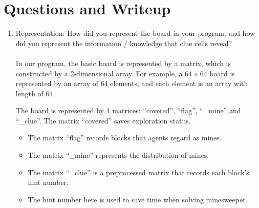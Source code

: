 \documentclass[letter]{article}
\begin{document}
\section{Questions and Writeup}
\label{sec:Questions and Writeup}
\begin{enumerate}
	\item {Representation: How did you represent the board in your program, and how did you represent the information / knowledge that clue cells reveal?} \\
	\\
	In our program, the basic board is represented by a matrix, which is constructed by a 2-dimensional array. For example, a $ 64 \times 64 $ board is represented by an array of 64 elements, and each element is an array with length of 64. 
	
	The board is represented by 4 matrices:  “covered”, “flag”,  “\_mine” and “\_clue”. The matrix “covered” saves exploration status. 
	\begin{itemize}
		\item {The matrix “flag” records blocks that agents regard as mines.} 
		\item {The matrix “\_mine” represents the distribution of mines.} 
		\item {The matrix “\_clue” is a preprocessed matrix that records each block’s hint number.} 
		\item {The hint number here is used to save time when solving minesweeper.} 
	\end{itemize}   
	

\end{enumerate}
\end{document}
